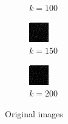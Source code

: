 \documentclass[a4paper, landscape]{article}
\begin{document}
\begin{figure}[H]
\begin{subfigure}{0.09\linewidth}
        \caption{$k = 100$}
    \end{subfigure}
    \begin{subfigure}{0.09\linewidth}
        \centering
        \includegraphics[width=\linewidth]{k = 150.png}
        \caption{$k = 150$}
    \end{subfigure}
    \begin{subfigure}{0.09\linewidth}
        \centering
        \includegraphics[width=\linewidth]{k = 200.png}
        \caption{$k = 200$}
    \end{subfigure}
    \caption{Original images}
    \label{fig:o}
\end{figure}
\end{document}
